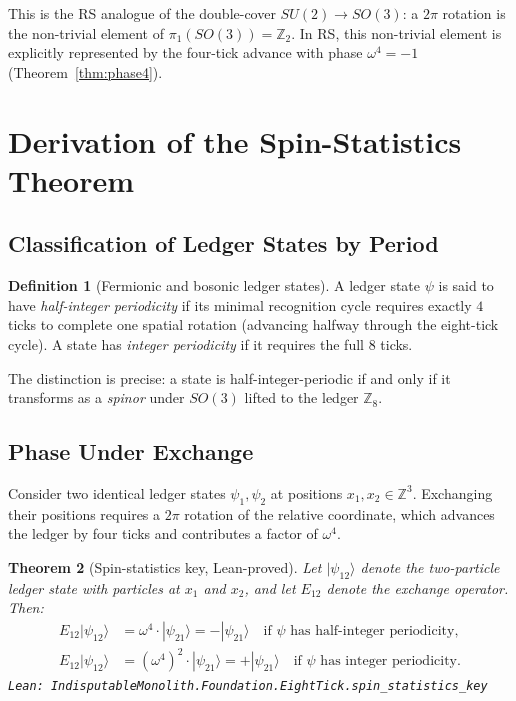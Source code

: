 \documentclass[12pt,a4paper]{article}
\newtheorem{theorem}{Theorem}[section]
\theoremstyle{definition}
\newtheorem{definition}[theorem]{Definition}
\theoremstyle{remark}
\begin{document}
This is the RS analogue of the double-cover $SU(2) \to SO(3)$: a
$2\pi$ rotation is the non-trivial element of $\pi_1(SO(3)) = \mathbb{Z}_2$.
In RS, this non-trivial element is explicitly represented by the four-tick
advance with phase $\omega^4 = -1$ (Theorem~\ref{thm:phase4}).

\section{Derivation of the Spin-Statistics Theorem}
\label{sec:derivation}

\subsection{Classification of Ledger States by Period}

\begin{definition}[Fermionic and bosonic ledger states]
A ledger state $\psi$ is said to have \emph{half-integer periodicity}
if its minimal recognition cycle requires exactly $4$ ticks to complete
one spatial rotation (advancing halfway through the eight-tick cycle).
A state has \emph{integer periodicity} if it requires the full $8$ ticks.
\end{definition}

The distinction is precise: a state is half-integer-periodic if and only
if it transforms as a \emph{spinor} under $SO(3)$ lifted to the ledger
$\mathbb{Z}_8$.

\subsection{Phase Under Exchange}

Consider two identical ledger states $\psi_1, \psi_2$ at positions
$x_1, x_2 \in \mathbb{Z}^3$.  Exchanging their positions requires a
$2\pi$ rotation of the relative coordinate, which advances the
ledger by four ticks and contributes a factor of $\omega^4$.

\begin{theorem}[Spin-statistics key, Lean-proved]\label{thm:spinstat}
Let $|\psi_{12}\rangle$ denote the two-particle ledger state with
particles at $x_1$ and $x_2$, and let $E_{12}$ denote the exchange
operator.  Then:
\begin{align}
  E_{12}|\psi_{12}\rangle &= \omega^4 \cdot |\psi_{21}\rangle
    = -|\psi_{21}\rangle
    \quad \text{if } \psi \text{ has half-integer periodicity,} \\
  E_{12}|\psi_{12}\rangle &= (\omega^4)^2 \cdot |\psi_{21}\rangle
    = +|\psi_{21}\rangle
    \quad \text{if } \psi \text{ has integer periodicity.}
\end{align}
\texttt{Lean: IndisputableMonolith.Foundation.EightTick.spin\_statistics\_key}
\end{theorem}
\end{document}
